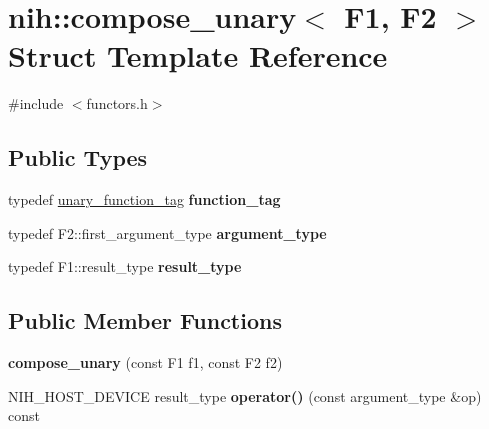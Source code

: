 \hypertarget{structnih_1_1compose__unary}{
\section{nih\-:\-:compose\-\_\-unary$<$ \-F1, \-F2 $>$ \-Struct \-Template \-Reference}
\label{structnih_1_1compose__unary}
}


{\ttfamily \#include $<$functors.\-h$>$}

\subsection*{\-Public \-Types}
\begin{DoxyCompactItemize}
\item 
\hypertarget{structnih_1_1compose__unary_a7479378d6ab31df2b2e36d6e0a546744}{
typedef \hyperlink{structnih_1_1unary__function__tag}{unary\-\_\-function\-\_\-tag} {\bfseries function\-\_\-tag}}
\label{structnih_1_1compose__unary_a7479378d6ab31df2b2e36d6e0a546744}

\item 
\hypertarget{structnih_1_1compose__unary_a04e14d84641d50967808ca63f3a6a1ea}{
typedef \-F2\-::first\-\_\-argument\-\_\-type {\bfseries argument\-\_\-type}}
\label{structnih_1_1compose__unary_a04e14d84641d50967808ca63f3a6a1ea}

\item 
\hypertarget{structnih_1_1compose__unary_aa01d4ec4c2d219d1d4fd9c5e90e9754a}{
typedef \-F1\-::result\-\_\-type {\bfseries result\-\_\-type}}
\label{structnih_1_1compose__unary_aa01d4ec4c2d219d1d4fd9c5e90e9754a}

\end{DoxyCompactItemize}
\subsection*{\-Public \-Member \-Functions}
\begin{DoxyCompactItemize}
\item 
\hypertarget{structnih_1_1compose__unary_a9f92da0a0f95599cf1ebea6e8f1b3300}{
{\bfseries compose\-\_\-unary} (const \-F1 f1, const \-F2 f2)}
\label{structnih_1_1compose__unary_a9f92da0a0f95599cf1ebea6e8f1b3300}

\item 
\hypertarget{structnih_1_1compose__unary_a022cb16dfa33efccaf8708f9473e598e}{
\-N\-I\-H\-\_\-\-H\-O\-S\-T\-\_\-\-D\-E\-V\-I\-C\-E result\-\_\-type {\bfseries operator()} (const argument\-\_\-type \&op) const }
\label{structnih_1_1compose__unary_a022cb16dfa33efccaf8708f9473e598e}

\end{DoxyCompactItemize}


